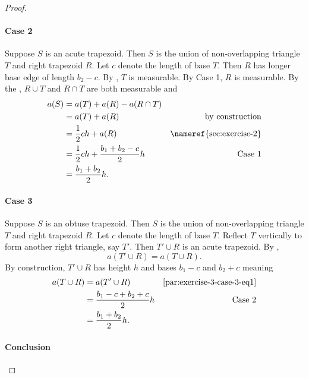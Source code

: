 \documentclass{article}
\begin{document}
\begin{proof}
  \paragraph{Case 2}%

    Suppose $S$ is an acute trapezoid.
    Then $S$ is the union of non-overlapping triangle $T$ and right trapezoid $R$.
    Let $c$ denote the length of base $T$.
    Then $R$ has longer base edge of length $b_2 - c$.
    By , $T$ is measurable.
    By Case 1, $R$ is measurable.
    By the , $R \cup T$ and $R \cap T$ are both
      measurable and
      \begin{align*}
        a(S)
          & = a(T) + a(R) - a(R \cap T) \\
          & = a(T) + a(R) & \text{by construction} \\
          & = \frac{1}{2}ch + a(R) & \text{\nameref{sec:exercise-2}} \\
          & = \frac{1}{2}ch + \frac{b_1 + b_2 - c}{2}h & \text{Case 1} \\
          & = \frac{b_1 + b_2}{2}h.
      \end{align*}

  \paragraph{Case 3}%

    Suppose $S$ is an obtuse trapezoid.
    Then $S$ is the union of non-overlapping triangle $T$ and right trapezoid $R$.
    Let $c$ denote the length of base $T$.
    Reflect $T$ vertically to form another right triangle, say $T'$.
    Then $T' \cup R$ is an acute trapezoid.
    By ,
      \begin{equation}
        \label{par:exercise-3-case-3-eq1}
        \tag{3.1}
        a(T' \cup R) = a(T \cup R).
      \end{equation}
    By construction, $T' \cup R$ has height $h$ and bases $b_1 - c$ and $b_2 + c$
      meaning
      \begin{align*}
        a(T \cup R)
          & = a(T' \cup R) & \eqref{par:exercise-3-case-3-eq1} \\
          & = \frac{b_1 - c + b_2 + c}{2}h & \text{Case 2} \\
          & = \frac{b_1 + b_2}{2}h.
      \end{align*}

  \paragraph{Conclusion}%


\end{proof}
\end{document}
